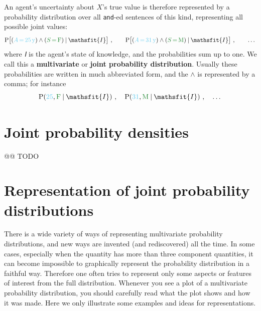 \documentclass[
  a4paper,
  DIV=11,
  numbers=noendperiod,
  oneside]{scrreprt}
\begin{document}
An agent's uncertainty about \(X\)'s true value is therefore represented
by a probability distribution over all \texttt{and}-ed sentences of this
kind, representing all possible joint values: \[
\mathrm{P}\bigl[({\color[RGB]{102,204,238}A \mathord{\,=\,}25\,\mathrm{y}}) \land ({\color[RGB]{34,136,51}S\mathord{\,=\,}\mathrm{F}}) \nonscript\:\vert\nonscript\:\mathopen{} \mathsfit{I}\bigr] \ , \qquad
\mathrm{P}\bigl[({\color[RGB]{102,204,238}A \mathord{\,=\,}31\,\mathrm{y}}) \land ({\color[RGB]{34,136,51}S\mathord{\,=\,}\mathrm{M}}) \nonscript\:\vert\nonscript\:\mathopen{} \mathsfit{I}\bigr] \ , \qquad
\dotsc
\] where \(\mathsfit{I}\) is the agent's state of knowledge, and the
probabilities sum up to one. We call this a {\textbf{multivariate}} or
{\textbf{joint probability distribution}}. Usually these probabilities
are written in much abbreviated form, and the \(\land\) is represented
by a comma; for instance \[
\mathrm{P}({\color[RGB]{102,204,238}25}, {\color[RGB]{34,136,51}\mathrm{F}} \nonscript\:\vert\nonscript\:\mathopen{} \mathsfit{I}) \ , \quad
\mathrm{P}({\color[RGB]{102,204,238}31}, {\color[RGB]{34,136,51}\mathrm{M}} \nonscript\:\vert\nonscript\:\mathopen{} \mathsfit{I}) \ , \quad
\dotsc
\]

\hypertarget{joint-probability-densities}{%
\section{Joint probability
densities}\label{joint-probability-densities}}

@@ TODO

\hypertarget{representation-of-joint-probability-distributions}{%
\section{Representation of joint probability
distributions}\label{representation-of-joint-probability-distributions}}

There is a wide variety of ways of representing multivariate probability
distributions, and new ways are invented (and rediscovered) all the
time. In some cases, especially when the quantity has more than three
component quantities, it can become impossible to graphically represent
the probability distribution in a faithful way. Therefore one often
tries to represent only some aspects or features of interest from the
full distribution. Whenever you see a plot of a multivariate probability
distribution, you should carefully read what the plot shows and how it
was made. Here we only illustrate some examples and ideas for
representations.
\end{document}
